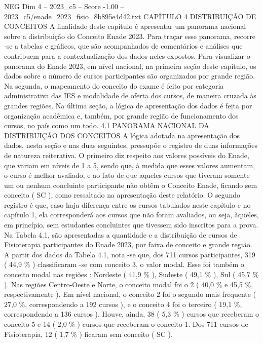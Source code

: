 \begin{textsample}{NEG Dim 4 – 2023\_c5 – Score -1.00 – 2023\_c5/enade\_2023\_fisio\_8b895e4d42.txt}  \label{ex:f4_neg_100}
CAPÍTULO 4 DISTRIBUIÇÃO DE CONCEITOS A finalidade deste capítulo é apresentar um panorama nacional sobre a distribuição do Conceito Enade 2023.
Para traçar esse panorama, recorre -se a tabelas e gráficos, que são acompanhados de comentários e análises que contribuem para a contextualização dos dados neles expostos.
Para visualizar o panorama do Enade 2023, em nível nacional, na primeira seção deste capítulo, os dados sobre o número de cursos participantes são organizados por grande região.
Na segunda, o mapeamento do conceito do exame é feito por categoria administrativa das IES e modalidade de oferta dos cursos, de maneira cruzada às grandes regiões.
Na última seção, a lógica de apresentação dos dados é feita por organização acadêmica e, também, por grande região de funcionamento dos cursos, no país como um todo. 4.1 PANORAMA NACIONAL DA DISTRIBUIÇÃO DOS CONCEITOS A lógica adotada na apresentação dos dados, nesta seção e nas duas seguintes, pressupõe o registro de duas informações de natureza reiterativa.
O primeiro diz respeito aos valores possíveis do Enade, que variam em níveis de 1 a 5, sendo que, à medida que esses valores aumentam, o curso é melhor avaliado, e ao fato de que aqueles cursos que tiveram somente um ou nenhum concluinte participante não obtêm o Conceito Enade, ficando sem conceito ( SC ), como ressaltado na apresentação deste relatório.
O segundo registro é que, caso haja diferença entre os cursos tabulados neste capítulo e no capítulo 1, ela corresponderá aos cursos que não foram avaliados, ou seja, àqueles, em princípio, sem estudantes concluintes que tivessem sido inscritos para a prova.
Na Tabela 4.1, são apresentadas a quantidade e a distribuição de cursos de Fisioterapia participantes do Enade 2023, por faixa de conceito e grande região.
A partir dos dados da Tabela 4.1, nota -se que, dos 711 cursos participantes, 319 ( 44,9 \% ) classificaram -se com conceito 3, o valor modal.
Esse foi também o conceito modal nas regiões : Nordeste ( 41,9 \% ), Sudeste ( 49,1 \% ), Sul ( 45,7 \% ).
Nas regiões Centro-Oeste e Norte, o conceito modal foi o 2 ( 40,0 \% e 45,5 \%, respectivamente ).
Em nível nacional, o conceito 2 foi o segundo mais frequente ( 27,0 \%, correspondendo a 192 cursos ), e o conceito 4 foi o terceiro ( 19,1 \%, correspondendo a 136 cursos ).
Houve, ainda, 38 ( 5,3 \% ) cursos que receberam o conceito 5 e 14 ( 2,0 \% ) cursos que receberam o conceito 1.
Dos 711 cursos de Fisioterapia, 12 ( 1,7 \% ) ficaram sem conceito ( SC ).

\end{textsample}
